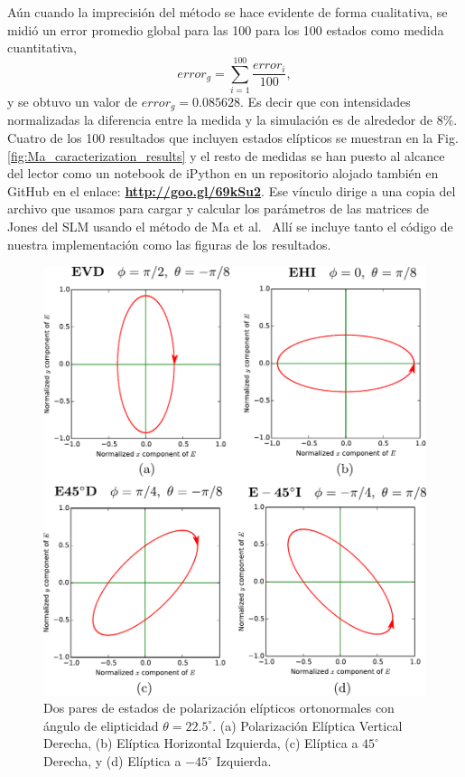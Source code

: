 Aún cuando la imprecisión del método se hace evidente de forma
cualitativa, se midió un error promedio global para las 100 para los
100 estados como medida cuantitativa, $$error_g =
\sum_{i=1}^{100}\frac{error_i}{100},$$ y se obtuvo un valor de $error_g
= 0.085628$. Es decir que con intensidades normalizadas la diferencia
entre la medida y la simulación es de alrededor de $8\%$.
Cuatro de los 100 resultados que incluyen estados elípticos se muestran en la
Fig. \ref{fig:Ma_caracterization_results} y el resto de medidas se han
puesto al alcance del lector como un notebook de iPython en un
repositorio alojado también en GitHub en el enlace: \href{http://goo.gl/69kSu2}{\textbf{http://goo.gl/69kSu2}}. 
Ese vínculo dirige a una copia del archivo que
usamos para cargar y calcular los parámetros de las matrices de Jones
del SLM usando el método de Ma et al.~ Allí se incluye tanto el código
de nuestra implementación como las figuras de los resultados. 
\begin{figure}[h!]
\centering
\includegraphics[scale = .6]{EVD_EHI_E45D_Em45I.pdf}
\caption[Estados de polarización elípticos]{Dos pares de estados de polarización
  elípticos ortonormales con ángulo de elipticidad $\theta = 22.5^{\circ}$. (a) Polarización Elíptica Vertical Derecha,
  (b) Elíptica Horizontal Izquierda, (c) Elíptica a $45^{\circ}$
  Derecha, y (d) Elíptica a $-45^{\circ}$ Izquierda.}
\label{fig:elliptic_states}
\end{figure}

